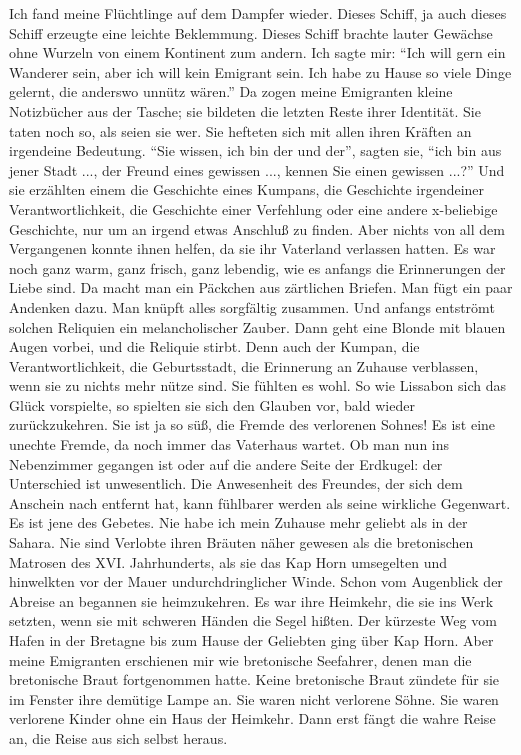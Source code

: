 \documentclass[12pt,ngerman,draft]{scrartcl}
\begin{document}
Ich fand meine Flüchtlinge auf dem Dampfer wieder. Dieses Schiff, ja auch dieses Schiff erzeugte eine leichte Beklemmung. Dieses Schiff brachte lauter Gewächse ohne Wurzeln von einem Kontinent zum andern. Ich sagte mir: \enquote{Ich will gern ein Wanderer sein, aber ich will kein Emigrant sein. Ich habe zu Hause so viele Dinge gelernt, die anderswo unnütz wären.} Da zogen meine Emigranten kleine Notizbücher aus der Tasche; sie bildeten die letzten Reste ihrer Identität. Sie taten noch so, als seien sie wer. Sie hefteten sich mit allen ihren Kräften an irgendeine Bedeutung. \enquote{Sie wissen, ich bin der und der}, sagten sie, \enquote{ich bin aus jener Stadt ..., der Freund eines gewissen ..., kennen Sie einen gewissen ...?} Und sie erzählten einem die Geschichte eines Kumpans, die Geschichte irgendeiner Verantwortlichkeit, die Geschichte einer Verfehlung oder eine andere x-beliebige Geschichte, nur um an irgend etwas Anschluß zu finden. Aber nichts von all dem Vergangenen konnte ihnen helfen, da sie ihr Vaterland verlassen hatten. Es war noch ganz warm, ganz frisch, ganz lebendig, wie es anfangs die Erinnerungen der Liebe sind. Da macht man ein Päckchen aus zärtlichen Briefen. Man fügt ein paar Andenken dazu. Man knüpft alles sorgfältig zusammen. Und anfangs entströmt solchen Reliquien ein melancholischer Zauber. Dann geht eine Blonde mit blauen Augen vorbei, und die Reliquie stirbt. Denn auch der Kumpan, die Verantwortlichkeit, die Geburtsstadt, die Erinnerung an Zuhause verblassen, wenn sie zu nichts mehr nütze sind. Sie fühlten es wohl. So wie Lissabon sich das Glück vorspielte, so spielten sie sich den Glauben vor, bald wieder zurückzukehren. Sie ist ja so süß, die Fremde des verlorenen Sohnes! Es ist eine unechte Fremde, da noch immer das Vaterhaus wartet. Ob man nun ins Nebenzimmer gegangen ist oder auf die andere Seite der Erdkugel: der Unterschied ist unwesentlich. Die Anwesenheit des Freundes, der sich dem Anschein nach entfernt hat, kann fühlbarer werden als seine wirkliche Gegenwart. Es ist jene des Gebetes. Nie habe ich mein Zuhause mehr geliebt als in der Sahara. Nie sind Verlobte ihren Bräuten näher gewesen als die bretonischen Matrosen des XVI. Jahrhunderts, als sie das Kap Horn umsegelten und hinwelkten vor der Mauer undurchdringlicher Winde. Schon vom Augenblick der Abreise an begannen sie heimzukehren. Es war ihre Heimkehr, die sie ins Werk setzten, wenn sie mit schweren Händen die Segel hißten. Der kürzeste Weg vom Hafen in der Bretagne bis zum Hause der Geliebten ging über Kap Horn. Aber meine Emigranten erschienen mir wie bretonische Seefahrer, denen man die bretonische Braut fortgenommen hatte. Keine bretonische Braut zündete für sie im Fenster ihre demütige Lampe an. Sie waren nicht verlorene Söhne. Sie waren verlorene Kinder ohne ein Haus der Heimkehr. Dann erst fängt die wahre Reise an, die Reise aus sich selbst heraus.
\end{document}
